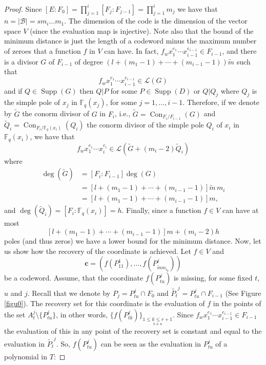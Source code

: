 \documentclass{amsart}
\newcommand{\m}{\mathcal}
\newcommand{\F}{\mathbb{F}}
\newcommand{\con}{\operatorname{Con}}
\newcommand{\supp}{\operatorname{Supp}}
\theoremstyle{definition}
\begin{document}
\begin{proof}
Since $[E:F_0]=\prod_{j=1}^{i}[F_j:F_{j-1}]=\prod_{j=1}^{i}m_{j}$ we have that $n=|\m{B}|=sm_{i}\ldots m_1$. The dimension of the code is the dimension of the vector space $V$ (since the evaluation map is injective). 
Note also that the bound of the minimum distance is just the length of a codeword minus the maximum number of zeroes that a function $f$ in $V$ can have.
In fact, $f_wx_1^{e_1}\cdots x_{i-1}^{e_{i-1}} \in F_{i-1}$, and there is a divisor $G$ of $F_{i-1}$ of degree $(l+(m_1-1)+\cdots+(m_{i-1}-1))\widetilde{m}$ such that $$f_wx_1^{e_1}\cdots x_{i-1}^{e_{i-1}} \in \m{L}(G)$$ and if $Q\in \supp(G)$ then $Q|P$ for some $P\in \supp(D)$ or $Q|Q_j$ where $Q_j$ is the simple pole of $x_j$ in $\F_q(x_j)$, for some $j=1, \ldots, i-1$. Therefore, if we denote by $\tilde{G}$ the conorm divisor of $G$ in $F_{i}$, i.e., $\tilde{G}=\con_{F_{i}/F_{i-1}}(G)$ and $\tilde{Q}_i=\con_{F_{i}/\F_q(x_i)}(Q_i)$ the conorm divisor of the simple pole $Q_i$ of $x_i$ in $\F_q(x_i)$, we have that 
 $$f_wx_1^{e_1}\cdots x_{i}^{e_{i}} \in \m{L}(\tilde{G}+(m_{i}-2)\tilde{Q}_{i})$$ where \begin{align*}
 \deg(\tilde{G})&=[F_{i}:F_{i-1}]\deg(G)\\
 &=[l+(m_1-1)+\cdots+(m_{i-1}-1)]\widetilde{m}\,m_i\\
 &=[l+(m_1-1)+\cdots+(m_{i-1}-1)]m,
 \end{align*} 
 and $\deg(\tilde{Q}_i)=[F_{i}:\F_q(x_i)]=h$. Finally, since a function $f\in V$ can have at most $$[l+(m_1-1)+\cdots+(m_{i-1}-1)]m+(m_{i}-2)h$$ poles (and thus zeros) we have a lower bound for the minimum distance. 
Now, let us show how the recovery of the coordinate is achieved. Let $f\in V$ and $$\boldsymbol{c}=(f(P_{11}^1), \ldots, %
f(P_{\widetilde{m}m_{i_0}}^j))$$ be a codeword. Assume, that the coordinate $f(P_{tu}^j)$ is missing, for some fixed $t$, $u$ and $j$. Recall that we denote by $P_j=P_{tu}^j\cap F_0$ and $\widetilde{P_t}^j=P_{tu}^j\cap F_{i-1}$ (See Figure \ref{figu0}). The recovery set for this coordinate is the evaluation of $f$ in the points of the set $A_t^j\setminus\{P_{tu}^j\}$, in other words, $\{f(P_{tk}^j)\}_{\underset{k\neq u}{1\leq k\leq r+1}}.$ Since $f_wx_1^{e_1}\cdots x_{i-1}^{e_{i-1}} \in F_{i-1}$ the evaluation of this in any point of the recovery set is constant and equal to the evaluation in $\widetilde{P_t}^j$. So, $f(P_{tu}^j)$ can be seen as the evaluation in $P_{tu}^j$ of a polynomial in  $T$: 

\end{proof}
\end{document}
